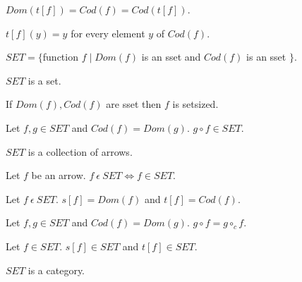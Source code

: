 \documentclass{article}
\newcommand{\mcirc}{\circ_{c}}
\newcommand{\inn}{~\epsilon~}
\newcommand{\innn}{~\epsilon~} %
\begin{document}
\begin{forthel}
\begin{axiom}
			$Dom(t[f])=Cod(f)=Cod(t[f])$.
		\end{axiom}
		
		\begin{axiom} 
			$t[f](y)=y$ for every element $y$ of $Cod(f)$.
		\end{axiom}
		
		\begin{definition} 
		\begin{center}
			$SET = \{ $function $f \mid Dom(f)$ is an sset and $Cod(f)$ is an sset $\}$.
		\end{center}
			
		\end{definition}
		
		\begin{axiom} 
			$SET$ is a set.
		\end{axiom}
		
		\begin{axiom} 
			If $Dom(f), Cod(f)$ are sset then $f$ is setsized.
		\end{axiom}
		
		\begin{axiom}
			Let $f,g \in SET$ and $Cod(f)=Dom(g)$. $g \circ f \in SET$.
		\end{axiom}
		

		
		\begin{axiom}
			$SET$ is a collection of arrows.
		\end{axiom}


		
		\begin{axiom}
			Let $f$ be an arrow. $f \inn SET \iff f \in SET$.
		\end{axiom}
		
		\begin{axiom}
		  Let $f \innn SET$. $s[f]=Dom(f)$ and $t[f]=Cod(f)$.
		\end{axiom}
		
		\begin{axiom} 
			Let $f,g \in SET$ and $Cod(f)=Dom(g)$. $g \circ f = g \mcirc f$.
		\end{axiom}

		\begin{axiom}
		Let $f\in SET$. $s[f] \in SET$ and $t[f] \in SET$.
		\end{axiom}
		
		\begin{axiom} 
			$SET$ is a category.
		\end{axiom}
		


	\end{forthel}
	
\end{document}
